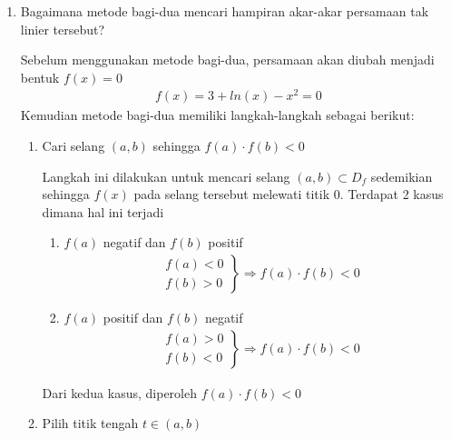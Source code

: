 \documentclass[12pt]{article}
\begin{document}
\begin{enumerate}
    \item {
        Bagaimana metode bagi-dua mencari hampiran akar-akar persamaan tak linier tersebut?\bigskip

        Sebelum menggunakan metode bagi-dua, persamaan akan diubah menjadi bentuk $ f(x) = 0 $ 
        \begin{align*}
            f(x) = 3 + ln(x) - x^2 = 0
        \end{align*}
        Kemudian metode bagi-dua memiliki langkah-langkah sebagai berikut:
        \begin{enumerate}
            \item {
                Cari selang $ (a,b) $ sehingga $ f(a) \cdot f(b) < 0 $ \bigskip

                Langkah ini dilakukan untuk mencari selang $ (a,b) \subset D_f $ sedemikian sehingga $ f(x) $ pada selang tersebut melewati titik 0. Terdapat 2 kasus dimana hal ini terjadi
                \begin{enumerate}
                    \item {
                        $ f(a) $ negatif dan $ f(b) $ positif
                        \begin{align*}
                            \left.
                            \begin{matrix}
                                f(a) < 0 \\
                                f(b) > 0
                            \end{matrix} 
                            \right\} \Rightarrow f(a) \cdot f(b) < 0
                        \end{align*}
                    }
                    \item {
                        $ f(a) $ positif dan $ f(b) $ negatif
                        \begin{align*}
                            \left.
                            \begin{matrix}
                                f(a) > 0 \\
                                f(b) < 0
                            \end{matrix} 
                            \right\} \Rightarrow f(a) \cdot f(b) < 0
                        \end{align*}
                    }
                \end{enumerate}
                Dari kedua kasus, diperoleh $ f(a) \cdot f(b) < 0 $
            }\bigskip
            \item {
                Pilih titik tengah $ t \in (a,b) $ \bigskip

}
\end{enumerate}}
\end{enumerate}
\end{document}
